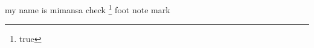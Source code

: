 \documentclass{article}
\begin{document}
my name is mimansa check \footnote{true} foot note mark\footnotemark
{}
\end{document}
